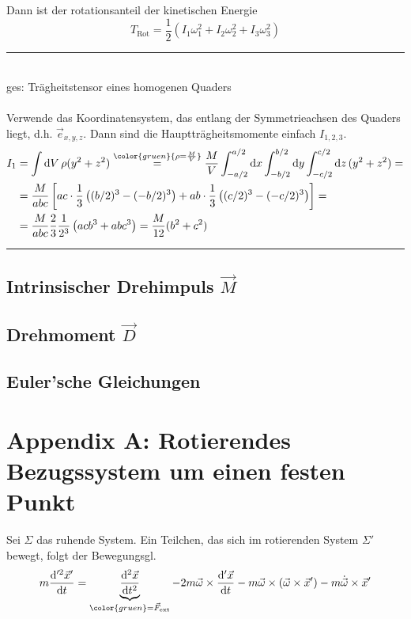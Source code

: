 \documentclass{article}
\newcommand{\diff}{\mathrm{d}}
\newcommand{\lr}[1]{\left(#1\right)}
\newcommand{\lreck}[1]{\left[#1\right]}
\newcommand{\comment}[1]{{\color{gruen} {#1}}}
\begin{document}

Dann ist der rotationsanteil der kinetischen Energie
	\begin{equation}
		T_\text{Rot} = \frac{1}{2} \lr{ I_1\omega_1^2 + I_2\omega_2^2 + I_3\omega_3^2 }
	\end{equation}


\vspace{0.5cm}


{\color{blue}
\hrule
	\\
	ges: Trägheitstensor eines homogenen Quaders\\
	\\
	Verwende das Koordinatensystem, das entlang der Symmetrieachsen des Quaders liegt, d.h. $\vec{e}_{x,y,z}$. Dann sind die Hauptträgheitsmomente einfach $I_{1,2,3}$.
		\begin{align*}
			I_1 &= \int \diff V\, \rho (y^2 + z^2) \stackrel{\comment{\rho = \frac{M}{V}}}{=} \frac{M}{V} \int_{-a/2}^{a/2} \diff x \int_{-b/2}^{b/2} \diff y \int_{-c/2}^{c/2} \diff z\, (y^2 + z^2) = \\
			&= \frac{M}{abc} \lreck{ ac\cdot \frac{1}{3} \lr{ (b/2)^3 - (-b/2)^3 } + ab\cdot \frac{1}{3} \lr{ (c/2)^3 - (-c/2)^3 } } = \\
			&= \frac{M}{abc} \frac{2}{3} \frac{1}{2^3} \lr{ ac b^3 + ab c^3} = \frac{M}{12} (b^2 + c^2)
		\end{align*}
\hrule
}


\subsection{Intrinsischer Drehimpuls $\vec{M}$}


\subsection{Drehmoment $\vec{D}$}


\subsection{Euler'sche Gleichungen}


\newpage


\section*{Appendix A: Rotierendes Bezugssystem um einen festen Punkt}
Sei $\Sigma$ das ruhende System. Ein Teilchen, das sich im rotierenden System $\Sigma'$ bewegt, folgt der Bewegungsgl.
	\begin{equation}
		m \frac{\diff'^2\vec{x}'}{\diff t} = \underbrace{\frac{\diff^2\vec{x}}{\diff t^2}}_{\color{gruen}=\vec{F}_{\text{ext}}} - 2m\vec{\omega} \times \frac{\diff'\vec{x}}{\diff t} - m\vec{\omega}\times(\vec{\omega}\times\vec{x}') - m\dot{\vec{\omega}}\times\vec{x}'
	\end{equation}
\end{document}
